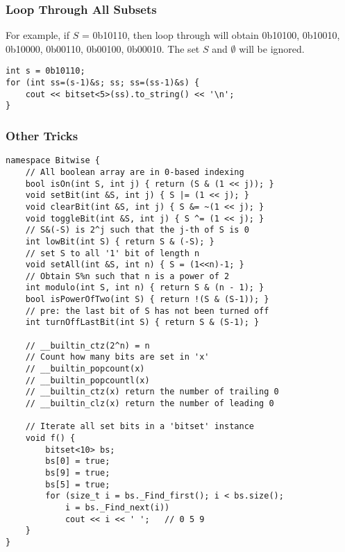 \documentclass[10pt]{article}{\twocolumn}
\begin{document}
\subsubsection{Loop Through All Subsets}
For example, if $S$ = 0b10110, then loop through will obtain 0b10100, 0b10010, 0b10000, 0b00110, 0b00100, 0b00010. The set $S$ and $\emptyset$ will be ignored.
\begin{lstlisting}
int s = 0b10110;
for (int ss=(s-1)&s; ss; ss=(ss-1)&s) {
    cout << bitset<5>(ss).to_string() << '\n';
}
\end{lstlisting}
\subsubsection{Other Tricks}
\begin{lstlisting}
namespace Bitwise {
    // All boolean array are in 0-based indexing
    bool isOn(int S, int j) { return (S & (1 << j)); }
    void setBit(int &S, int j) { S |= (1 << j); }
    void clearBit(int &S, int j) { S &= ~(1 << j); }
    void toggleBit(int &S, int j) { S ^= (1 << j); }
    // S&(-S) is 2^j such that the j-th of S is 0
    int lowBit(int S) { return S & (-S); }
    // set S to all '1' bit of length n
    void setAll(int &S, int n) { S = (1<<n)-1; }
    // Obtain S%n such that n is a power of 2
    int modulo(int S, int n) { return S & (n - 1); }
    bool isPowerOfTwo(int S) { return !(S & (S-1)); }
    // pre: the last bit of S has not been turned off
    int turnOffLastBit(int S) { return S & (S-1); }

    // __builtin_ctz(2^n) = n
    // Count how many bits are set in 'x'
    // __builtin_popcount(x)
    // __builtin_popcountl(x)
    // __builtin_ctz(x) return the number of trailing 0
    // __builtin_clz(x) return the number of leading 0
    
    // Iterate all set bits in a 'bitset' instance
    void f() {
        bitset<10> bs;
        bs[0] = true;
        bs[9] = true;
        bs[5] = true;
        for (size_t i = bs._Find_first(); i < bs.size(); 
            i = bs._Find_next(i))
            cout << i << ' ';   // 0 5 9
    }
}
\end{lstlisting}
\end{document}

